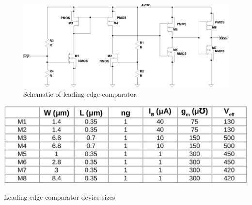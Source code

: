 \documentclass[12pt,oneside,final]{siuethesis}
\theoremstyle{definition}
\begin{document}
\begin{figure}[htbp!]
	\centering
 	\includegraphics[scale=0.55,keepaspectratio=true]{../Design_Reports/CFD_circuit_report/images/le_cmp.pdf}
 	\caption{Schematic of leading edge comparator.}
 	\label{FIG:LE_CMP}
\end{figure}

\begin{table}[htbp!]
 \centering
 \includegraphics[scale=.35,keepaspectratio=true]{./ch3_figures/le_cmp_sizes.png}
 \caption{Leading-edge comparator device sizes}
 \label{tab:le-comp-sizes}
\end{table}
\end{document}
